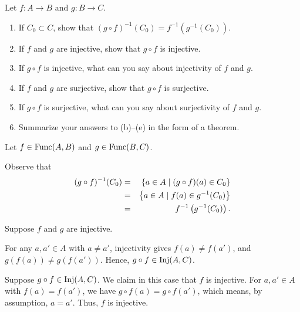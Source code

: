 \documentclass[a4paper,12pt]{article}
\begin{document}
\begin{exe}
	Let \( f:A \to B \)
	and \( g:B \to C \).
	\begin{enumerate}
		\item
		      If \( C_0 \subset C \),
		      show that
		      \( (g \circ f)^{-1}(C_0) = f ^{-1} \left( g ^{-1}(C_0) \right) \).
		      
		\item
		      If \( f \) and \( g \) are injective, show that \( g \circ f \) is injective.
		      
		\item
		      If \( g \circ f \) is injective, what can you say about injectivity of \( f \) and \( g \).
		      
		\item
		      If \( f \) and \( g \) are surjective, show that \( g \circ f \) is surjective.
		      
		\item
		      If \( g \circ f \) is surjective, what can you say about surjectivity of \( f \) and \( g \).
		      
		\item
		      Summarize your answers to (b)--(e) in the form of a theorem.
	\end{enumerate}
\end{exe}\begin{sol}
	Let
	\( f \in \mathrm{Func}(A,B) \)
	and
	\( g \in \mathrm{Func}(B,C) \).
	
	Observe that 
	\begin{eqnarray*}
		(g \circ f)^{-1}(C_0)
		&=&	\left\{ a \in A \;|\;
		(g \circ f)(a) \in C_0
		\right\}\\
		&=&	\left\{ a \in A \;|\;
		f(a) \in g^{-1}(C_0)
		\right\}\\
		&=& f ^{-1} \left( g ^{-1}(C_0) \right).
	\end{eqnarray*}
	
	Suppose
	\( f \)
	and
	\( g \)
	are injective.
	
	For any
	\( a,a' \in A \)
	with
	\( a \neq a' \),
	injectivity gives
	\( f(a)\neq f(a') \),
	and
	\( g(f(a)) \neq g(f(a')) \).
	Hence,
	\( g \circ f \in \mathrm{Inj}(A,C)\).
	
	Suppose
	\( g \circ f \in \mathrm{Inj}(A,C)\).
	We claim in this case that
	\( f \) 
	is injective.
	For \( a,a' \in A \)
	with
	\( f(a) = f(a') \),
	we have
	\( g \circ f(a) = g \circ f(a') \),
	which means, by assumption, 
	\( a=a' \).
	Thus,
	\( f \)
	is injective.
	

\end{sol}
\end{document}

